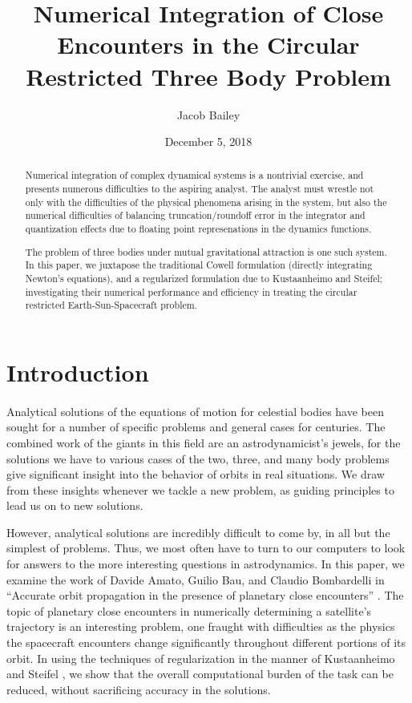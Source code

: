 \documentclass[11pt,twoside,letterpaper]{article}
\begin{document}
\title{Numerical Integration of Close Encounters in the Circular
  Restricted Three Body Problem}
\author{Jacob Bailey}
\date{December 5, 2018}
\maketitle

\begin{abstract}
  Numerical integration of complex dynamical systems is a nontrivial
  exercise, and presents numerous difficulties to the aspiring
  analyst. The analyst must wrestle not only with the difficulties of
  the physical phenomena arising in the system, but also the numerical
  difficulties of balancing truncation/roundoff error in the
  integrator and quantization effects due to floating point
  represenations in the dynamics functions.

  The problem of three bodies under mutual gravitational attraction is
  one such system. In this paper, we juxtapose the traditional Cowell
  formulation (directly integrating Newton's equations), and a
  regularized formulation due to Kustaanheimo and Steifel;
  investigating their numerical performance and efficiency in treating
  the circular restricted Earth-Sun-Spacecraft problem. 

  \end{abstract}

  \section {Introduction}
  \paragraph{}
    Analytical solutions of the equations of motion for celestial
    bodies have been sought for a number of specific problems and
    general cases for centuries. The combined work of the giants in
    this field are an astrodynamicist’s jewels, for the solutions we
    have to various cases of the two, three, and many body problems
    give significant insight into the behavior of orbits in real
    situations. We draw from these insights whenever we tackle a new
    problem, as guiding principles to lead us on to new solutions.

    However, analytical solutions are incredibly difficult to come by,
    in all but the simplest of problems. Thus, we most often have to
    turn to our computers to look for answers to the more interesting
    questions in astrodynamics. In this paper, we examine the work of
    Davide Amato, Guilio Bau, and Claudio Bombardelli in “Accurate
    orbit propagation in the presence of planetary close encounters”
    \cite{amato_2017}. The topic of planetary close encounters in
    numerically determining a satellite’s trajectory is an interesting
    problem, one fraught with difficulties as the physics the
    spacecraft encounters change significantly throughout different
    portions of its orbit. In using the techniques of regularization
    in the manner of Kustaanheimo and Steifel \cite{stiefel_1971}, we
    show that the overall computational burden of the task can be
    reduced, without sacrificing accuracy in the solutions.
    
\end{document}
